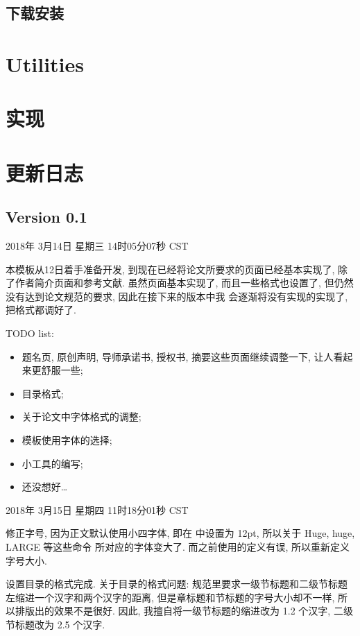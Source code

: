 \documentclass{cugthesis}
\begin{document}
\section{下载安装}
\label{sec:xia_zai_an_zhuang_}



\chapter{Utilities}

\chapter{实现}

\chapter{更新日志}

\section{Version 0.1}
\label{sec:version_0_1}

2018年 3月14日 星期三 14时05分07秒 CST

本模板从12日着手准备开发, 到现在已经将论文所要求的页面已经基本实现了, 除了作者简介页面和参考文献.
虽然页面基本实现了, 而且一些格式也设置了, 但仍然没有达到论文规范的要求, 因此在接下来的版本中我
会逐渐将没有实现的实现了, 把格式都调好了.

TODO list:
\begin{itemize}
    \item 题名页, 原创声明, 导师承诺书, 授权书, 摘要这些页面继续调整一下, 让人看起来更舒服一些;
    \item 目录格式;
    \item 关于论文中字体格式的调整;
    \item 模板使用字体的选择;
    \item 小工具的编写;
    \item 还没想好\dots
\end{itemize}

2018年 3月15日 星期四 11时18分01秒 CST

修正字号, 因为正文默认使用小四字体, 即在 \CTeX{} 中设置为 12pt, 所以关于 Huge, huge, LARGE 等这些命令
所对应的字体变大了. 而之前使用的定义有误, 所以重新定义字号大小.

设置目录的格式完成. 关于目录的格式问题: 规范里要求一级节标题和二级节标题左缩进一个汉字和两个汉字的距离,
但是章标题和节标题的字号大小却不一样, 所以排版出的效果不是很好. 因此, 我擅自将一级节标题的缩进改为 1.2
个汉字, 二级节标题改为 2.5 个汉字. 
\end{document}
